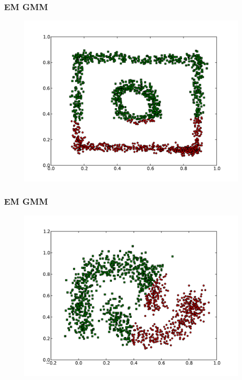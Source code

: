 \documentclass{beamer}
\begin{document}
\begin{frame}
\frametitle{EM GMM}
    \begin{figure}[]
    \includegraphics[scale=0.5]{GMM_circle-weird.pdf}
    \end{figure}
\end{frame}

\begin{frame}
\frametitle{EM GMM}
    \begin{figure}[]
    \includegraphics[scale=0.5]{GMM_half-moons.pdf}
    \end{figure}
\end{frame}
\end{document}
